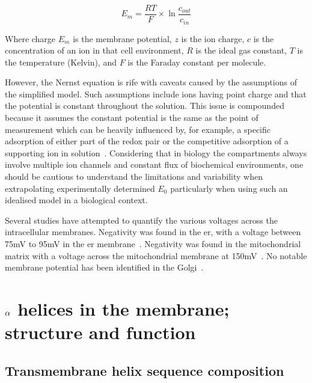 \begin{equation}
{E}_{m}=\frac{RT}{F}\times \ln { \frac{{c}_{out}}{{c}_{in}} }
\end{equation}

Where charge ${E}_{m}$ is the membrane potential, $z$ is the ion charge, $c$ is the concentration of an ion in that cell environment, $R$ is the ideal gas constant, $T$ is the temperature (Kelvin), and $F$ is the Faraday constant per molecule.

However, the Nernst equation is rife with caveats caused by the assumptions of the simplified model.
Such assumptions include ions having point charge and that the potential is constant throughout the solution.
This issue is compounded because it assumes the constant potential is the same as the point of measurement which can be heavily influenced by, for example, a specific adsorption of either part of the redox pair or the competitive adsorption of a supporting ion in solution~\cite{Feiner1994}.
Considering that in biology the compartments always involve multiple ion channels and constant flux of biochemical environments, one should be cautious to understand the limitations and variability when extrapolating experimentally determined ${E}_{0}$ particularly when using such an idealised model in a biological context.

Several studies have attempted to quantify the various voltages across the intracellular membranes.
Negativity was found in the \gls{er}, with a voltage between 75mV to 95mV in the \gls{er} membrane~\cite{Qin2011, Worley1994}.
Negativity was found in the mitochondrial matrix with a  voltage across the mitochondrial membrane at 150mV~\cite{Perry2011}.
No notable membrane potential has been identified in the Golgi~\cite{Schapiro2000, Llopis1998}.

\section{$\protect\alpha$ helices in the membrane; structure and function}

\subsection{Transmembrane helix sequence composition}

